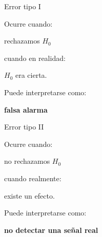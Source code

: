 \documentclass[aspectratio=169,11pt]{beamer}
\begin{document}
\begin{frame}{Error tipo I}

Ocurre cuando:

\begin{center}

rechazamos $H_0$

\end{center}

cuando en realidad:

\begin{center}

$H_0$ era cierta.

\end{center}

\vspace{0.4cm}

Puede interpretarse como:

\begin{center}

\Large
\textbf{falsa alarma}
\end{center}

\end{frame}


\begin{frame}{Error tipo II}

Ocurre cuando:

\begin{center}

no rechazamos $H_0$

\end{center}

cuando realmente:

\begin{center}

existe un efecto.

\end{center}

\vspace{0.4cm}

Puede interpretarse como:

\begin{center}

\Large
\textbf{no detectar una señal real}
\end{center}

\end{frame}

\end{document}
